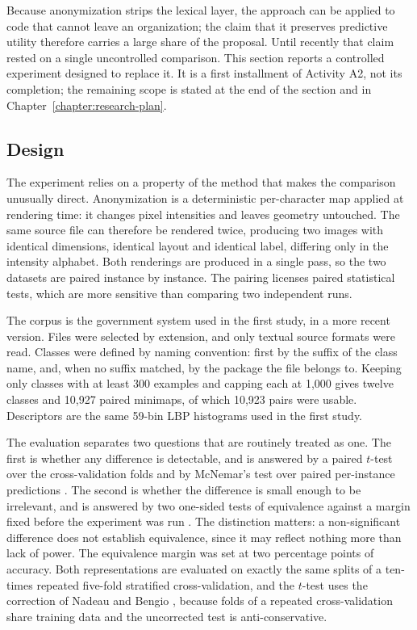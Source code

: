 Because anonymization strips the lexical layer, the approach can be applied to
code that cannot leave an organization; the claim that it preserves predictive
utility therefore carries a large share of the proposal. Until recently that claim rested on a single
uncontrolled comparison. This section reports a controlled experiment designed
to replace it. It is a first installment of Activity A2, not its completion;
the remaining scope is stated at the end of the section and in
Chapter~\ref{chapter:research-plan}.

\subsection{Design}

The experiment relies on a property of the method that makes the comparison
unusually direct. Anonymization is a deterministic per-character map applied
at rendering time: it changes pixel intensities and leaves geometry untouched.
The same source file can therefore be rendered twice, producing two images with
identical dimensions, identical layout and identical label, differing only in
the intensity alphabet. Both renderings are produced in a single pass, so the
two datasets are paired instance by instance. The pairing licenses paired
statistical tests, which are more sensitive than comparing two independent
runs.

The corpus is the government system used in the first study, in a more recent
version. Files were selected by extension, and only
textual source formats were read. Classes were defined by naming convention:
first by the suffix of the class name, and, when no suffix matched, by the
package the file belongs to. Keeping only classes with at least 300 examples and
capping each at 1,000 gives twelve classes and 10,927 paired minimaps, of which
10,923 pairs were usable. Descriptors are the same 59-bin LBP histograms used in
the first study.

The evaluation separates two questions that are routinely treated as one. The
first is whether any difference is detectable, and is answered by a paired
$t$-test over the cross-validation folds and by McNemar's test over paired
per-instance predictions \cite{mcnemar1947note}. The second is whether the
difference is small enough to be irrelevant, and is answered by two one-sided
tests of equivalence against a margin fixed before the experiment was run
\cite{schuirmann1987comparison}. The distinction matters: a non-significant
difference does not establish equivalence, since it may reflect nothing more
than lack of power. The equivalence margin was set at two percentage points of
accuracy. Both representations are evaluated on exactly the same splits of a
ten-times repeated five-fold stratified cross-validation, and the $t$-test uses
the correction of Nadeau and Bengio \cite{nadeau2003inference}, because folds of
a repeated cross-validation share training data and the uncorrected test is
anti-conservative.

